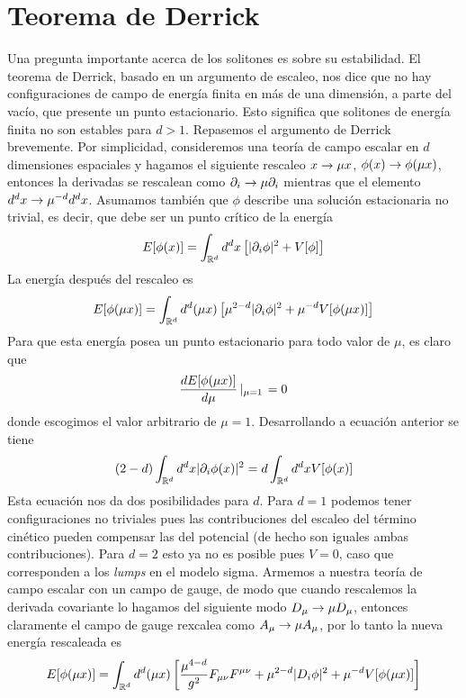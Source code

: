 \section{Teorema de Derrick}

Una pregunta importante acerca de los solitones es sobre su estabilidad. El teorema de Derrick, basado en un argumento de escaleo, nos dice que no hay configuraciones de campo de energía finita en más de una dimensión, a parte del vacío, que presente un punto estacionario. Esto significa que solitones de energía finita no son estables para $d>1$. Repasemos el argumento de Derrick brevemente. Por simplicidad, consideremos una teoría de campo escalar en $d$ dimensiones espaciales y hagamos el siguiente rescaleo $x\rightarrow \mu x$, $\phi(x)\rightarrow\phi(\mu x)$, entonces la derivadas se rescalean como $\partial_i\rightarrow\mu\partial_i$ mientras que el elemento $d^dx\rightarrow \mu^{-d}d^dx$. Asumamos también que $\phi$ describe una solución estacionaria no trivial, es decir, que debe ser un punto crítico de la energía
\begin{align}
	E[\phi(x)]=\int_{\mathbb{R}^d}d^dx\left[|\partial_i\phi|^2+V[\phi]\right]
\end{align}
La energía después del rescaleo es
\begin{align}
	E[\phi(\mu x)] = \int_{\mathbb{R}^d} d^d(\mu x)\left[\mu^{2-d}|\partial_i\phi|^2+\mu^{-d}V[\phi(\mu x)]\right]
\end{align}
Para que esta energía posea un punto estacionario para todo valor de $\mu$, es claro que
\begin{align}
	\frac{dE[\phi(\mu x)]}{d\mu}\left|_{\mu=1}\right. =0 \label{eq:0.2.0.3}
\end{align}
donde escogimos el valor arbitrario de $\mu=1$. Desarrollando a ecuación anterior se tiene
\begin{align}
	(2-d)\int_{\mathbb{R}^d}d^dx|\partial_i\phi(x)|^2=d\int_{\mathbb{R}^d}d^dxV[\phi(x)]
\end{align}
Esta ecuación nos da dos posibilidades para $d$. Para $d=1$ podemos tener configuraciones no triviales pues las contribuciones del escaleo del término cinético pueden compensar las del potencial (de hecho son iguales ambas contribuciones). Para $d=2$ esto ya no es posible pues $V=0$, caso que corresponden a los \emph{lumps} en el modelo sigma. Armemos a nuestra teoría de campo escalar con un campo de gauge, de modo que cuando rescalemos la derivada covariante lo hagamos del siguiente modo $D_\mu\rightarrow\mu D_\mu$, entonces claramente el campo de gauge rexcalea como $A_\mu\rightarrow\mu A_\mu$, por lo tanto la nueva energía rescaleada es
\begin{align}
	E[\phi(\mu x)] = \int_{\mathbb{R}^d} d^d(\mu x)\left[\frac{\mu^{4-d}}{g^2}F_{\mu\nu}F^{\mu\nu}+\mu^{2-d}|D_i\phi|^2+\mu^{-d}V[\phi(\mu x)]\right]
\end{align}
